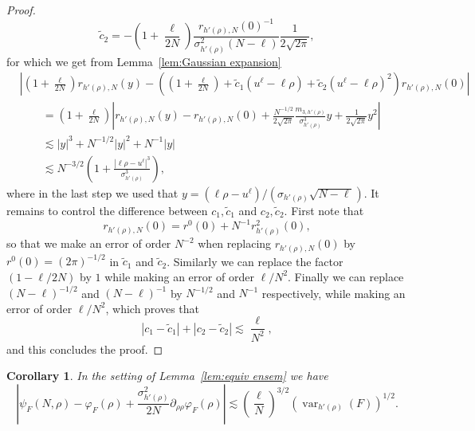 \documentclass[11pt, a4paper]{article}
\newcommand{\tmop}[1]{\ensuremath{\operatorname{#1}}}
\newtheorem{corollary}[theorem]{Corollary}
\newcommand{\1}{\mathbf{1}}
\begin{document}
\begin{proof}
\[     \tilde{c}_2 = - \left( 1 + \frac{\ell}{2 N} \right) \frac{r_{h' (\rho),
     N} (0)^{- 1}}{\sigma_{h' (\rho)}^2 (N - \ell)} \frac{1}{2 \sqrt{2 \pi}},
  \]
  for which we get from Lemma~\ref{lem:Gaussian expansion}
  \begin{align*}
   &\left| \left( 1 + \frac{\ell}{2 N} \right) r_{h' (\rho), N} (y) - \left(
   \left( 1 + \frac{\ell}{2 N} \right) + \tilde{c}_1 (u^{\ell} - \ell \rho)
   + \tilde{c}_2 (u^{\ell} - \ell \rho)^2 \right) r_{h' (\rho), N} (0)
   \right| \\
   &\qquad= \left( 1 + \frac{\ell}{2 N} \right) \left| r_{h' (\rho), N} (y) - r_{h'
   (\rho), N} (0) + \frac{N^{- 1 / 2}}{2 \sqrt{2 \pi}} \frac{m_{3, h'
   (\rho)}}{\sigma^3_{h' (\rho)}} y + \frac{1}{2 \sqrt{2 \pi}} y^2 \right| \\
   &\qquad\lesssim | y |^3 + N^{- 1 / 2} | y |^2 + N^{- 1} | y | \\
   &\qquad\lesssim N^{- 3 / 2} \left( 1 + \frac{| \ell \rho - u^{\ell} |^3}{\sigma_{h' (\rho)}^3} \right),
  \end{align*}
  where in the last step we used that $y = (\ell \rho - u^{\ell}) / \left(
  \sigma_{h' (\rho)} \sqrt{N - \ell} \right)$. It remains to control the
  difference between $c_1, \tilde{c}_1$ and $c_2, \tilde{c}_2$. First note
  that
  \[ r_{h' (\rho), N} (0) = r^0 (0) + N^{- 1} r_{h' (\rho)}^2 (0), \]
  so that we make an error of order $N^{- 2}$ when replacing $r_{h' (\rho), N}
  (0)$ by $r^0 (0) = (2 \pi)^{- 1 / 2}$ in $\tilde{c}_1$ and $\tilde{c}_2$.
  Similarly we can replace the factor $(1 - \ell / 2 N)$ by $1$ while making
  an error of order $\ell / N^2$. Finally we can replace $(N - \ell)^{- 1 /
  2}$ and $(N - \ell)^{- 1}$ by $N^{- 1 / 2}$ and $N^{- 1}$ respectively,
  while making an error of order $\ell / N^2$, which proves that
  \[ | c_1 - \tilde{c}_1 | + | c_2 - \tilde{c}_2 | \lesssim \frac{\ell}{N^2},
  \]
  and this concludes the proof.
\end{proof}

\begin{corollary}
  \label{cor:equivalence of ensembles}In the setting of Lemma~\ref{lem:equiv
  ensem} we have
  \[ \left| \psi_F (N, \rho) - \varphi_F (\rho) + \frac{\sigma_{h'
     (\rho)}^2}{2 N} \partial_{\rho \rho} \varphi_F (\rho) \right| \lesssim
     \left( \frac{\ell}{N} \right)^{3 / 2} (\tmop{var}_{h' (\rho)} (F))^{1 /
     2} . \]
\end{corollary}
\end{document}
